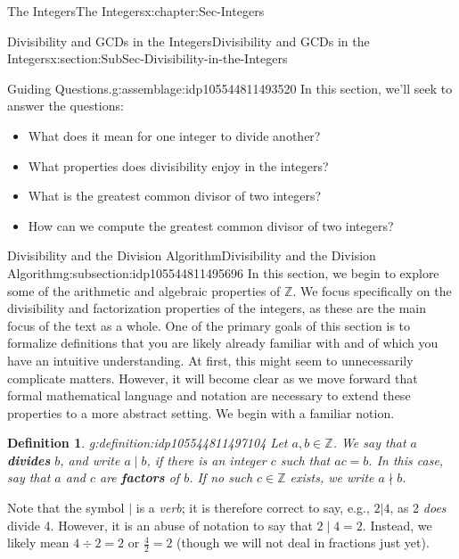 \documentclass[oneside,10pt,]{book}
\newcommand{\terminology}[1]{\textbf{#1}}
\numberwithin{equation}{section}
\def\Z{{\mathbb Z}}
\newtheorem{definition}[theorem]{Definition}
\begin{document}
\begin{chapterptx}{The Integers}{}{The Integers}{}{}{x:chapter:Sec-Integers}
\typeout{************************************************}
%
\begin{sectionptx}{Divisibility and GCDs in the Integers}{}{Divisibility and GCDs in the Integers}{}{}{x:section:SubSec-Divisibility-in-the-Integers}
\begin{assemblage}{Guiding Questions.}{g:assemblage:idp105544811493520}%
In this section, we'll seek to answer the questions: %
\begin{itemize}[label=\textbullet]
\item{}What does it mean for one integer to divide another?%
\item{}What properties does divisibility enjoy in the integers?%
\item{}What is the greatest common divisor of two integers?%
\item{}How can we compute the greatest common divisor of two integers?%
\end{itemize}
%
\end{assemblage}
%
%
\typeout{************************************************}
\typeout{************************************************}
%
\begin{subsectionptx}{Divisibility and the Division Algorithm}{}{Divisibility and the Division Algorithm}{}{}{g:subsection:idp105544811495696}
In this section, we begin to explore some of the arithmetic and algebraic properties of \(\Z\). We focus specifically on the divisibility and factorization properties of the integers, as these are the main focus of the text as a whole. One of the primary goals of this section is to formalize definitions that you are likely already familiar with and of which you have an intuitive understanding. At first, this might seem to unnecessarily complicate matters. However, it will become clear as we move forward that formal mathematical language and notation are necessary to extend these properties to a more abstract setting. We begin with a familiar notion.%
\begin{definition}{}{g:definition:idp105544811497104}%
%
%
Let \(a,b\in \Z\). We say that \(a\) \terminology{divides} \(b\), and write \(a\mid b\), if there is an integer \(c\) such that \(ac = b\). In this case, say that \(a\) and \(c\) are \terminology{factors} of \(b\). If no such \(c\in \Z\) exists, we write \(a\nmid b\).%
\end{definition}
Note that the symbol \(|\) is a \emph{verb}; it is therefore correct to say, e.g., \(2|4\), as 2 \emph{does} divide 4. However, it is an abuse of notation to say that \(2\mid 4 = 2\). Instead, we likely mean \(4\div 2 = 2\) or \(\frac{4}{2} = 2\) (though we will not deal in fractions just yet).%

\end{subsectionptx}
\end{sectionptx}
\end{chapterptx}
\end{document}

